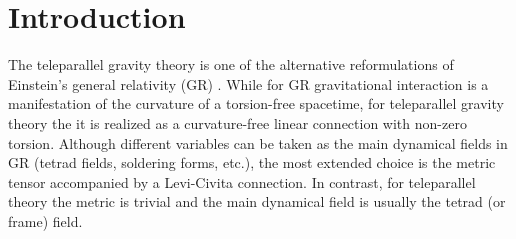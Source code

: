 \documentclass[
10pt, %
a4paper, %
oneside, %
headinclude,footinclude, %
BCOR5mm, %
]{scrartcl}
\newcommand{\ho}[1]{\textcolor{magenta}{HO: #1}}
\begin{document}

\setlength\parindent{10pt} %
\setlength{\parskip}{5pt} %


\section{Introduction}

The teleparallel gravity theory is one of the alternative reformulations of Einstein's 
general relativity (GR) \cite{Hehl1976,AldrovandiPereiraBook,Cai2016}. While for GR
gravitational interaction is a manifestation of the curvature of a torsion-free
spacetime,
for teleparallel gravity theory the it is realized as a curvature-free linear connection
with non-zero torsion.
Although different variables can be taken as the main dynamical fields in GR
(tetrad fields, soldering forms, etc.),
the most extended choice is the metric tensor accompanied by a Levi-Civita connection.
In contrast, for teleparallel theory the metric is trivial and the main dynamical field
is usually the tetrad (or frame) field.
\end{document}
